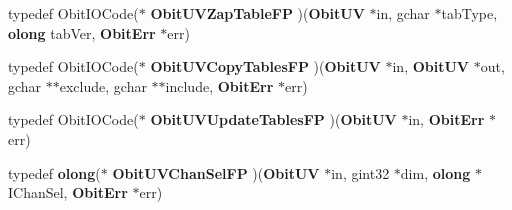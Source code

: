 \begin{CompactItemize}
\item 
typedef Obit\-IOCode($\ast$ {\bf Obit\-UVZap\-Table\-FP} )({\bf Obit\-UV} $\ast$in, gchar $\ast$tab\-Type, {\bf olong} tab\-Ver, {\bf Obit\-Err} $\ast$err)
\item 
typedef Obit\-IOCode($\ast$ {\bf Obit\-UVCopy\-Tables\-FP} )({\bf Obit\-UV} $\ast$in, {\bf Obit\-UV} $\ast$out, gchar $\ast$$\ast$exclude, gchar $\ast$$\ast$include, {\bf Obit\-Err} $\ast$err)
\item 
typedef Obit\-IOCode($\ast$ {\bf Obit\-UVUpdate\-Tables\-FP} )({\bf Obit\-UV} $\ast$in, {\bf Obit\-Err} $\ast$err)
\item 
typedef {\bf olong}($\ast$ {\bf Obit\-UVChan\-Sel\-FP} )({\bf Obit\-UV} $\ast$in, gint32 $\ast$dim, {\bf olong} $\ast$IChan\-Sel, {\bf Obit\-Err} $\ast$err)
\end{CompactItemize}
